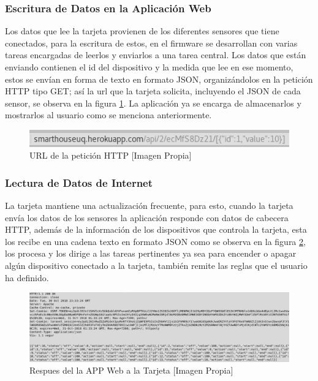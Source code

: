 \subsubsection{Escritura de Datos en la Aplicación Web}

Los datos que lee la tarjeta provienen de los diferentes sensores que tiene conectados, para la escritura de estos, en el firmware se desarrollan con varias tareas encargadas de leerlos y enviarlos a una tarea central. Los datos que están enviando contienen el id del dispositivo y la medida que lee en ese momento, estos se envían en forma de texto en formato JSON, organizándolos en la petición HTTP tipo GET; así la url que la tarjeta solicita, incluyendo el JSON de cada sensor, se observa en la figura \ref{fig:json}. La aplicación ya se encarga de almacenarlos y mostrarlos al usuario como se menciona anteriormente.\\

\begin{figure}[!t]
	\centering
	\caption{URL de la petición HTTP [Imagen Propia]}
	\label{fig:json}
	\includegraphics[width=0.9\linewidth]{Imagenes/JSON}
\end{figure}


\subsubsection{Lectura de Datos de Internet}

La tarjeta mantiene una actualización frecuente, para esto, cuando la tarjeta envía los datos de los sensores la aplicación responde con datos de cabecera HTTP, además de la información de los dispositivos que controla la tarjeta, esta los recibe en una cadena texto en formato JSON como se observa en la figura \ref{fig:httprqstesp}, los procesa y los dirige a las tareas pertinentes ya sea para encender o apagar algún dispositivo conectado a la tarjeta, también remite las reglas que el usuario ha definido.\\

\begin{figure}[!t]
	\centering
	\caption{Respues del la APP Web a la Tarjeta [Imagen Propia]}
	\label{fig:httprqstesp}
	\includegraphics[width=0.9\linewidth]{Imagenes/HTTPRqstesp}
\end{figure}

